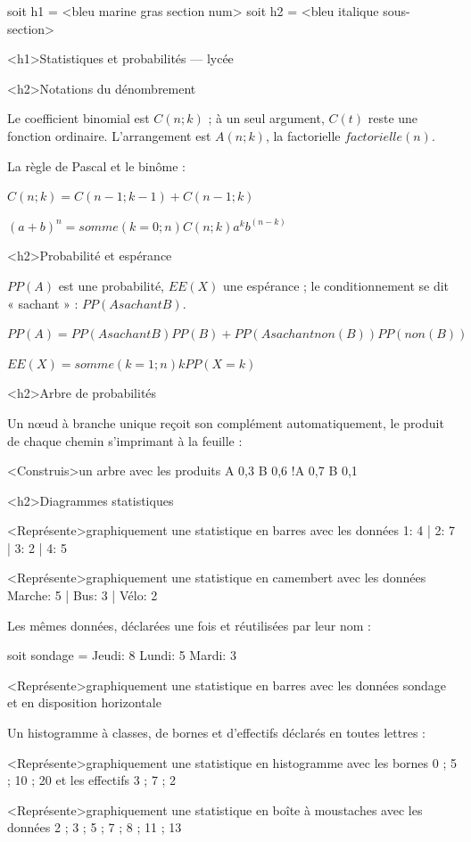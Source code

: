 \documentclass[marges=20, taille=11, precision=3]{texecole}
\begin{document}
soit h1 = <bleu marine gras section num>
soit h2 = <bleu italique sous-section>

<h1>Statistiques et probabilités — lycée


<h2>Notations du dénombrement

Le coefficient binomial est $C(n; k)$ ; à un seul argument, $C(t)$ reste une fonction ordinaire. L'arrangement est $A(n; k)$, la factorielle $factorielle(n)$.

La règle de Pascal et le binôme :

$C(n; k) = C(n-1; k-1) + C(n-1; k)$

$(a + b)^n = somme(k=0;n) C(n; k) a^k b^(n-k)$

<h2>Probabilité et espérance

$PP(A)$ est une probabilité, $EE(X)$ une espérance ; le conditionnement se dit « sachant » : $PP(A sachant B)$.

$PP(A) = PP(A sachant B) PP(B) + PP(A sachant non(B)) PP(non(B))$

$EE(X) = somme(k=1;n) k PP(X = k)$

<h2>Arbre de probabilités

Un nœud à branche unique reçoit son complément automatiquement, le produit de chaque chemin s'imprimant à la feuille :

<Construis>un arbre avec les produits {
	A 0,3 {
		B 0,6
	}
	!A 0,7 {
		B 0,1
	}
}

<h2>Diagrammes statistiques

<Représente>graphiquement une statistique en barres avec les données {1: 4 | 2: 7 | 3: 2 | 4: 5}

<Représente>graphiquement une statistique en camembert avec les données {Marche: 5 | Bus: 3 | Vélo: 2}

Les mêmes données, déclarées une fois et réutilisées par leur nom :

soit sondage = {
	Jeudi: 8
	Lundi: 5
	Mardi: 3
}

<Représente>graphiquement une statistique en barres avec les données sondage et en disposition horizontale

Un histogramme à classes, de bornes et d'effectifs déclarés en toutes lettres :

<Représente>graphiquement une statistique en histogramme avec les bornes {0 ; 5 ; 10 ; 20} et les effectifs {3 ; 7 ; 2}

<Représente>graphiquement une statistique en boîte à moustaches avec les données {2 ; 3 ; 5 ; 7 ; 8 ; 11 ; 13}
\end{document}
